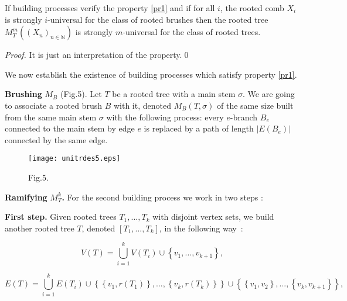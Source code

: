 \documentclass{llncs}
\begin{document}
\begin{lemma} If building processes verify the property \ref{pr1} and
if for all $i$, the rooted comb $X_i $ is strongly $i$-universal
for the class of rooted brushes then the rooted tree $M_T^m \left(
{\left( {X_n } \right)_{n \in \mathbb{N}} } \right)$ is strongly
$m$-universal for the class of rooted trees.
\end{lemma}




\begin{proof}It is just an interpretation of the property.\qed
\end{proof}




We now establish the existence of building processes which satisfy
property \ref{pr1}.

\textbf{Brushing} $M_{B}$ (Fig.5). Let $T$ be a rooted tree with a
main stem $\sigma $. We are going to associate a rooted brush $B$
with it, denoted $M_B \left( {T,\sigma } \right)$ of the same size
built from the same main stem $\sigma $ with the following
process: every $e$-branch $B_e $ connected to the main stem by
edge $e$ is replaced by a path of length $\left| {E\left( {B_e }
\right)} \right|$ connected by the same edge.

\begin{figure}[htbp]
\centerline{\texttt{[image: unitrdes5.eps]}}
\label{fig5}
\begin{center}
Fig.5.
\end{center}
\end{figure}


\textbf{Ramifying }$M_T^k $\textbf{.} For the second building
process we work in two steps :





\textbf{First step.} Given rooted trees $T_1 ,...,T_k $ with
disjoint vertex sets, we build another rooted tree $T$, denoted
$\left[ {T_1 ,...,T_k } \right]$, in the following way~:


\[
V(T) = \bigcup\limits_{i = 1}^k {V\left( {T_i } \right)} \cup \left\{ {v_1
,...,v_{k + 1} } \right\},
\]




\[
E(T) = \bigcup\limits_{i = 1}^k {E\left( {T_i } \right)} \cup \left\{
{\left\{ {v_1 ,r\left( {T_1 } \right)} \right\},...,\left\{ {v_k ,r\left(
{T_k } \right)} \right\}} \right\} \cup \left\{ {\left\{ {v_1 ,v_2 }
\right\},...,\left\{ {v_k ,v_{k + 1} } \right\}} \right\},
\]
\end{document}

